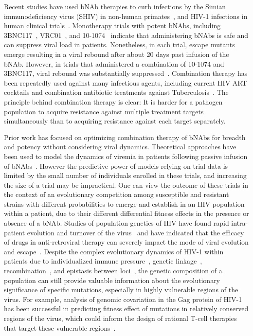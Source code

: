 \documentclass[aps,prx,noshowpacs,twocolumn,nofootinbib]{revtex4-2}
\begin{document}
Recent studies have used bNAb therapies to curb infections by the Simian immunodeficiency virus (SHIV)  in non-human primates~\cite{Shingai:2013kn,Barouch:2013gn,Julg:2017kg}, and  HIV-1 infections in human clinical trials~\cite{Caskey:2015hm,Bar:2016hg,Caskey:2017el,bar-onSafetyAntiviralActivity2018}. Monotherapy  trials with  potent bNAbs, including  3BNC117~\cite{Caskey:2015hm}, VRC01~\cite{Bar:2016hg}, and 10-1074~\cite{Caskey:2017el}  indicate that administering bNAbs is safe and can suppress viral load in patients.  Nonetheless, in each trial, escape mutants emerge resulting in a viral rebound after about 20 days past infusion of  the bNAb. However, in trials that administered a combination of 10-1074 and 3BNC117, viral rebound was substantially suppressed~\cite{Shingai:2013kn,bar-onSafetyAntiviralActivity2018}. Combination therapy has been repeatedly used against many infectious agents,  including current HIV ART cocktails and combination antibiotic treatments against Tuberculosis~\cite{Lienhardt:2012fl}. The principle behind combination therapy is clear: It is harder for a pathogen population to acquire resistance  against multiple treatment targets simultaneously than to acquiring resistance against each target separately. 


{Prior work has focused on optimizing combination therapy of bNAbs for breadth and potency \cite{yuPredictingBroadlyNeutralizing,waghOptimalCombinationsBroadly2016a} without considering viral dynamics.}   Theoretical approaches have been used to model the dynamics of viremia in patients following passive infusion of bNAbs~\cite{Lu:2016id,Reeves:2020ca,Saha:2020fd,meijersPredictingVivoEscape2021}. However the predictive power of models relying on trial data is limited by the small number of individuals enrolled in these trials, and increasing the size of a trial may be impractical. One can view the outcome of these trials in the context of an evolutionary competition among susceptible and resistant strains with different probabilities to emerge and establish in an HIV population within a patient, due to their different differential fitness effects  in the presence or absence of a bNAb. Studies of population genetics of HIV have found rapid intra-patient evolution and turnover of the virus~\cite{Lemey:2006wb,Zanini:2015gg} and have indicated that the efficacy of drugs in anti-retroviral therapy can severely impact the mode of viral evolution and escape~\cite{Feder:2016bc}. 
Despite the  complex evolutionary dynamics of HIV-1 within patients due to individualized immune pressure~\cite{Nourmohammad:2019ij}, genetic linkage~\cite{Zanini:2015gg}, recombination~\cite{Neher:2010dw,Zanini:2015gg}, and epistasis between loci~\cite{Bonhoeffer:2004cf,Zhang:2020bs}, the genetic composition of a population can still provide valuable information about the evolutionary significance of specific mutations, especially  in highly vulnerable regions of the virus. For example, analysis of genomic covariation in the Gag protein  of HIV-1 has been successful in predicting fitness effect of mutations in relatively conserved regions of the virus, which could inform the design of rational T-cell therapies that  target these vulnerable regions~\cite{Ferguson:2013kb}.   
\end{document}
